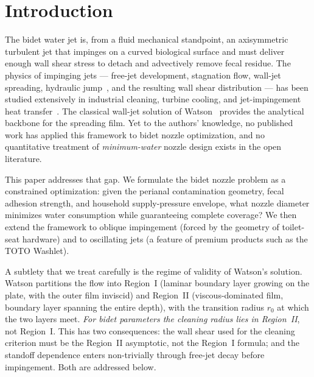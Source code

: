 \documentclass[aps,prfluids,reprint,amsmath,amssymb,floatfix]{revtex4-2}
\begin{document}
\maketitle

\section{Introduction}
\label{sec:intro}

The bidet water jet is, from a fluid mechanical standpoint, an axisymmetric
turbulent jet that impinges on a curved biological surface and must
deliver enough wall shear stress to detach and advectively remove fecal
residue. The physics of impinging jets --- free-jet development, stagnation
flow, wall-jet spreading, hydraulic jump~\citep{BohrEtAl1993,BushAristoff2003},
and the resulting wall shear
distribution --- has been studied extensively in industrial cleaning,
turbine cooling, and jet-impingement heat transfer~\citep{ZuckermanLior2006}.
The classical wall-jet solution of Watson~\citep{Watson1964} provides the
analytical backbone for the spreading film. Yet to the authors' knowledge,
no published work has applied this framework to bidet nozzle optimization,
and no quantitative treatment of \emph{minimum-water} nozzle design exists
in the open literature.

This paper addresses that gap. We formulate the bidet nozzle problem as a
constrained optimization: given the perianal contamination geometry, fecal
adhesion strength, and household supply-pressure envelope, what nozzle
diameter minimizes water consumption while guaranteeing complete coverage?
We then extend the framework to oblique impingement (forced by the
geometry of toilet-seat hardware) and to oscillating jets (a feature of
premium products such as the TOTO Washlet).

A subtlety that we treat carefully is the regime of validity of Watson's
solution. Watson partitions the flow into Region~I (laminar boundary
layer growing on the plate, with the outer film inviscid) and Region~II
(viscous-dominated film, boundary layer spanning the entire depth), with
the transition radius $r_0$ at which the two layers meet. \emph{For
bidet parameters the cleaning radius lies in Region~II}, not Region~I.
This has two consequences: the wall shear used for the cleaning criterion
must be the Region~II asymptotic, not the Region~I formula; and the
standoff dependence enters non-trivially through free-jet decay before
impingement. Both are addressed below.
\end{document}
